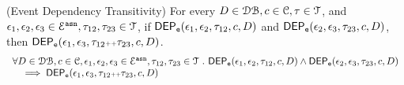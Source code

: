 %
%
%
%
\begin{lem}
	\label{lem:valdep_trans}
(Event Dependency Transitivity)
For every $D \in \dbdom , c \in \cdom, \trace \in \mathcal{T}$, and $\event_1, \event_2, \event_3 \in \eventset^{\asn}, \trace_{12}, \trace_{23} \in \mathcal{T}$,
if $\eventdep(\event_1, \event_2, \trace_{12}, c, D)$
and $\eventdep(\event_2, \event_3, \trace_{23}, c, D) $,
then $\eventdep(\event_1, \event_3, \trace_{12}\tracecat\trace_{23}, c, D)$.
  \[
	  \begin{array}{l}
  \forall D \in \dbdom , c \in \cdom, \event_1, \event_2, \event_3 \in \eventset^{\asn}, \trace_{12}, \trace_{23} \in \mathcal{T} \st 
  \eventdep(\event_1, \event_2, \trace_{12}, c, D) 
  \land
  \eventdep(\event_2, \event_3, \trace_{23}, c, D) 
  \\ \quad
  \implies
  \eventdep(\event_1, \event_3, \trace_{12}\tracecat\trace_{23}, c, D)
	  \end{array}
  \]
\end{lem}
